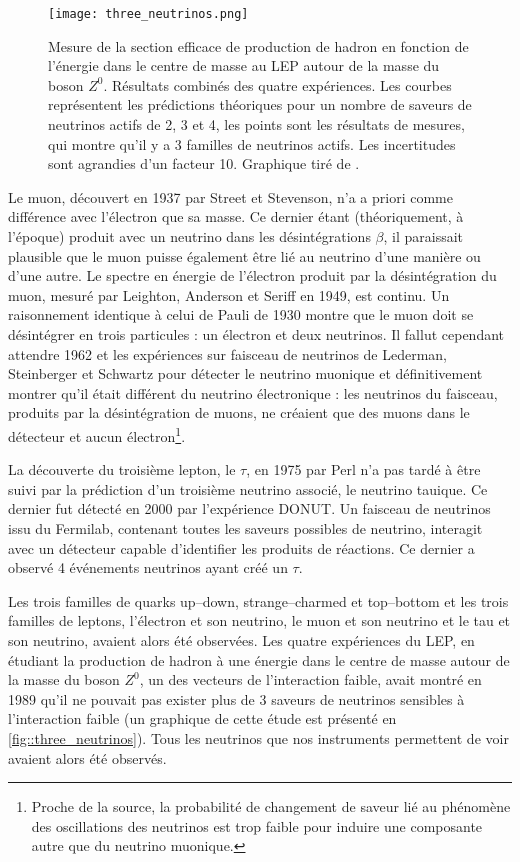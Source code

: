 			\begin{figure}
				\texttt{[image: three\_neutrinos.png]}
				\caption[Spectre de désintégration $\beta$.]{\label{fig::three_neutrinos}Mesure de la section efficace de production de hadron en fonction de l'énergie dans le centre de masse au LEP autour de la masse du boson $Z^0$. Résultats combinés des quatre expériences. Les courbes représentent les prédictions théoriques pour un nombre de saveurs de neutrinos actifs de 2, 3 et 4, les points sont les résultats de mesures, qui montre qu'il y a 3 familles de neutrinos actifs. Les incertitudes sont agrandies d'un facteur 10. Graphique tiré de \cite{Mele2015}.}
			\end{figure}
			Le muon, découvert en 1937 par Street et Stevenson\cite{Street1937}, n'a a priori comme différence avec l'électron que sa masse. Ce dernier étant (théoriquement, à l'époque) produit avec un neutrino dans les désintégrations $\beta$, il paraissait plausible que le muon puisse également être lié au neutrino d'une manière ou d'une autre.  Le spectre en énergie de l'électron produit par la désintégration du muon, mesuré par Leighton, Anderson et Seriff en 1949\cite{Leighton1949}, est continu. Un raisonnement identique à celui de Pauli de 1930 montre que le muon doit se désintégrer en trois particules : un électron et deux neutrinos. Il fallut cependant attendre 1962 et les expériences sur faisceau de neutrinos de Lederman, Steinberger et Schwartz\cite{Danby1962} pour détecter le neutrino muonique et définitivement montrer qu'il était différent du neutrino électronique : les neutrinos du faisceau, produits par la désintégration de muons, ne créaient que des muons dans le détecteur et aucun électron\footnote{Proche de la source, la probabilité  de changement de saveur lié au phénomène des oscillations des neutrinos est trop faible pour induire une composante autre que du neutrino muonique.}.
			
			La découverte du troisième lepton, le $\tau$, en 1975 par Perl\cite{Perl1975} n'a pas tardé à être suivi par la prédiction d'un troisième neutrino associé, le neutrino tauique. Ce dernier fut détecté en 2000 par l'expérience DONUT\cite{Collaboration2000}. Un faisceau de neutrinos issu du Fermilab, contenant toutes les saveurs possibles de neutrino, interagit avec un détecteur capable d'identifier les produits de réactions. Ce dernier a observé 4 événements neutrinos ayant créé un $\tau$.
			
			Les trois familles de quarks up--down, strange--charmed et top--bottom et les trois familles de leptons, l'électron et son neutrino, le muon et son neutrino et le tau et son neutrino, avaient alors été observées. Les quatre expériences du LEP, en étudiant la production de hadron à une énergie dans le centre de masse autour de la masse du boson $Z^0$, un des vecteurs de l'interaction faible, avait montré en 1989 qu'il ne pouvait pas exister plus de 3 saveurs de neutrinos sensibles à l'interaction faible\cite{DeCamp1989} (un graphique de cette étude est présenté en \autoref{fig::three_neutrinos}). Tous les neutrinos que nos instruments permettent de voir avaient alors été observés.
		    
